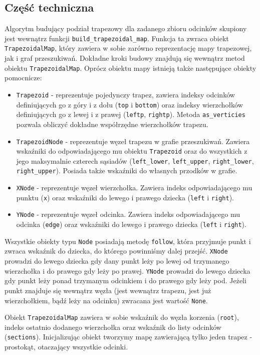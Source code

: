 \documentclass[11pt,a4paper]{article}
\begin{document}
\subsection{Część techniczna}
Algorytm budujący podział trapezowy dla zadanego
zbioru odcinków skupiony jest wewnątrz funkcji
\verb|build_trapezoidal_map|. Funkcja ta zwraca
obiekt \verb|TrapezoidalMap|, który zawiera w sobie
zarówno reprezentację mapy trapezowej, jak 
i graf przeszukiwań. Dokładne kroki budowy 
znajdują się wewnątrz metod obiektu \verb|TrapezoidalMap|.
Oprócz obiektu mapy istnieją także następujące obiekty
pomocnicze:
\begin{itemize}
    \item \verb|Trapezoid| - reprezentuje pojedynczy trapez, 
    zawiera indeksy odcinków definiujących go z góry i z dołu 
    (\verb|top| i \verb|bottom|) oraz indeksy wierzchołków
    definiujących go z lewej i z prawej (\verb|leftp|, \verb|rightp|).
    Metoda \verb|as_verticies| pozwala obliczyć dokładne współrzędne
    wierzchołków trapezu.
    \item \verb|TrapezoidNode| - reprezentuje węzeł trapezu
    w grafie przeszukiwań. Zawiera wskaźniki do odpowiadającego
    mu obiektu \verb|Trapezoid| oraz do wszystkich z jego
    maksymalnie czterech sąsiadów (\verb|left_lower|, \verb|left_upper|, 
    \verb|right_lower|, \verb|right_upper|). Posiada także wskaźniki
    do własnych przodków w grafie.
    \item \verb|XNode| - reprezentuje węzeł wierzchołka. Zawiera
    indeks odpowiadającego mu punktu (\verb|x|) oraz
    wskaźniki do lewego i prawego dziecka (\verb|left| i \verb|right|).
    \item \verb|YNode| - reprezentuje węzeł odcinka. Zawiera
    indeks odpowiadającego mu odcinka (\verb|edge|) oraz
    wskaźniki do lewego i prawego dziecka (\verb|left| i \verb|right|).
\end{itemize}
Wszystkie obiekty typu \verb|Node| posiadają metodę \verb|follow|,
która przyjmuje punkt i zwraca wskaźnik do dziecka, do którego
powinniśmy dalej przejść. \verb|XNode| prowadzi do lewego
dziecka gdy dany punkt leży po lewej od trzymanego wierzchołka
i do prawego gdy leży po prawej. \verb|YNode| prowadzi do lewego
dziecka gdy punkt leży ponad trzymanym odcinkiem i do prawego
gdy leży pod. Jeżeli punkt znajduje się wewnątrz węzła
(jest wewnątrz trapezu, jest już wierzchołkiem, bądź leży na odcinku)
zwracana jest wartość \verb|None|.

Obiekt \verb|TrapezoidalMap| zawiera w sobie wskaźnik do
węzła korzenia (\verb|root|), indeks ostatnio dodanego wierzchołka
oraz wskaźnik do listy odcinków (\verb|sections|). Inicjalizując
obiekt tworzymy mapę zawierającą tylko jeden trapez - prostokąt,
otaczający wszystkie odcinki.
\end{document}
